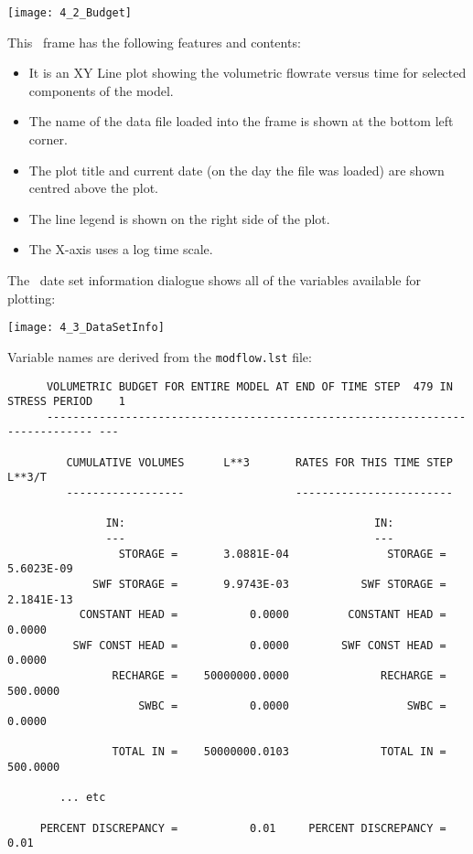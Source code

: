         \texttt{[image: 4\_2\_Budget]}

This \tecplot\ frame has the following features and contents:
\begin{itemize}
  \item It is an {\sf XY Line} plot showing the volumetric flowrate versus time for selected components of the model.
  \item The name of the data file loaded into the frame is shown at the bottom left corner.
  \item The plot title and current date (on the day the file was loaded) are shown centred above the plot.
  \item The line legend is shown on the right side of the plot.
  \item The X-axis uses a log time scale.
\end{itemize}

The \tecplot\ date set information dialogue shows all of the variables available for plotting:

        \texttt{[image: 4\_3\_DataSetInfo]}

Variable names are derived from the {\tt modflow.lst} file:
\begin{verbatim}
      VOLUMETRIC BUDGET FOR ENTIRE MODEL AT END OF TIME STEP  479 IN STRESS PERIOD    1
      ----------------------------------------------------------------------------- ---

         CUMULATIVE VOLUMES      L**3       RATES FOR THIS TIME STEP      L**3/T
         ------------------                 ------------------------

               IN:                                      IN:
               ---                                      ---
                 STORAGE =       3.0881E-04               STORAGE =       5.6023E-09
             SWF STORAGE =       9.9743E-03           SWF STORAGE =       2.1841E-13
           CONSTANT HEAD =           0.0000         CONSTANT HEAD =           0.0000
          SWF CONST HEAD =           0.0000        SWF CONST HEAD =           0.0000
                RECHARGE =    50000000.0000              RECHARGE =         500.0000
                    SWBC =           0.0000                  SWBC =           0.0000

                TOTAL IN =    50000000.0103              TOTAL IN =         500.0000

        ... etc

     PERCENT DISCREPANCY =           0.01     PERCENT DISCREPANCY =           0.01
\end{verbatim}


